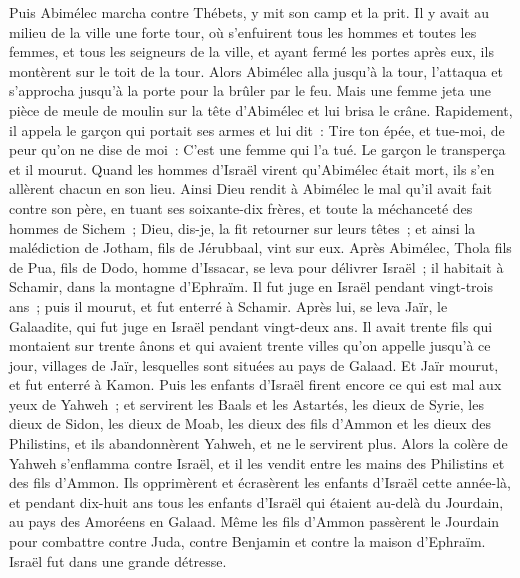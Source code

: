 \begin{multicols}{2}
Puis Abimélec marcha contre Thébets, y mit son camp et la prit.
Il y avait au milieu de la ville une forte tour, où s'enfuirent tous les hommes et toutes les femmes, et tous les seigneurs de la ville, et ayant fermé les portes après eux, ils montèrent sur le toit de la tour.
Alors Abimélec alla jusqu'à la tour, l'attaqua et s'approcha jusqu'à la porte pour la brûler par le feu.
Mais une femme jeta une pièce de meule de moulin sur la tête d'Abimélec et lui brisa le crâne.
Rapidement, il appela le garçon qui portait ses armes et lui dit~: Tire ton épée, et tue-moi, de peur qu'on ne dise de moi~: C'est une femme qui l'a tué. Le garçon le transperça et il mourut.
Quand les hommes d'Israël virent qu'Abimélec était mort, ils s'en allèrent chacun en son lieu.
Ainsi Dieu rendit à Abimélec le mal qu'il avait fait contre son père, en tuant ses soixante-dix frères,
et toute la méchanceté des hommes de Sichem~; Dieu, dis-je, la fit retourner sur leurs têtes~; et ainsi la malédiction de Jotham, fils de Jérubbaal, vint sur eux.
\VerseOne{}Après Abimélec, Thola fils de Pua, fils de Dodo, homme d'Issacar, se leva pour délivrer Israël~; il habitait à Schamir, dans la montagne d'Ephraïm.
Il fut juge en Israël pendant vingt-trois ans~; puis il mourut, et fut enterré à Schamir.
Après lui, se leva Jaïr, le Galaadite, qui fut juge en Israël pendant vingt-deux ans.
Il avait trente fils qui montaient sur trente ânons et qui avaient trente villes qu'on appelle jusqu'à ce jour, villages de Jaïr, lesquelles sont situées au pays de Galaad.
Et Jaïr mourut, et fut enterré à Kamon.
Puis les enfants d'Israël firent encore ce qui est mal aux yeux de Yahweh~; et servirent les Baals et les Astartés, les dieux de Syrie, les dieux de Sidon, les dieux de Moab, les dieux des fils d'Ammon et les dieux des Philistins, et ils abandonnèrent Yahweh, et ne le servirent plus.
Alors la colère de Yahweh s'enflamma contre Israël, et il les vendit entre les mains des Philistins et des fils d'Ammon.
Ils opprimèrent et écrasèrent les enfants d'Israël cette année-là, et pendant dix-huit ans tous les enfants d'Israël qui étaient au-delà du Jourdain, au pays des Amoréens en Galaad.
Même les fils d'Ammon passèrent le Jourdain pour combattre contre Juda, contre Benjamin et contre la maison d'Ephraïm. Israël fut dans une grande détresse.

\end{multicols}
